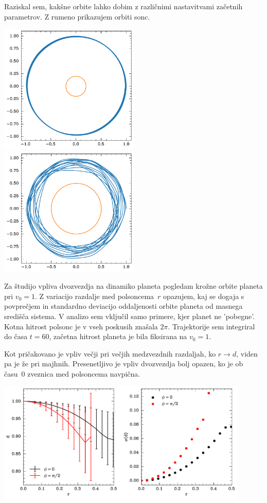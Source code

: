 Raziskal sem, kakšne orbite lahko dobim z različnimi nastavitvami začetnih parametrov. Z rumeno prikazujem orbiti sonc.
\begin{center}
    \includegraphics[width=0.5\textwidth]{../images/2-1-orbite_1.pdf}\hfill
    \includegraphics[width=0.5\textwidth]{../images/2-1-orbite_2.pdf}

\end{center}

Za študijo vpliva dvozvezdja na dinamiko planeta pogledam krožne orbite planeta pri $v_0 = 1$. Z variacijo razdalje med polsoncema~$r$ opazujem, kaj se dogaja s povprečjem in standardno deviacijo oddaljenosti  orbite planeta od masnega središča sistema. V analizo sem vključil samo primere, kjer planet ne 'pobegne'. Kotna hitrost polsonc je v vseh poskusih znašala $2\pi$. Trajektorije sem integriral do časa $t=60$, začetna hitrost planeta je bila fiksirana na $v_0=1$.

Kot pričakovano je vpliv večji pri večjih medzvezdnih razdaljah, ko $r \rightarrow d$, viden pa je že pri majhnih. Presenetljivo je vpliv dvozvezdja bolj opazen, ko je ob času~0 zveznica med polsoncema navpična.

\begin{center}
    \includegraphics[width=0.9\textwidth]{../images/2-2-vplivr.pdf}
\end{center}
